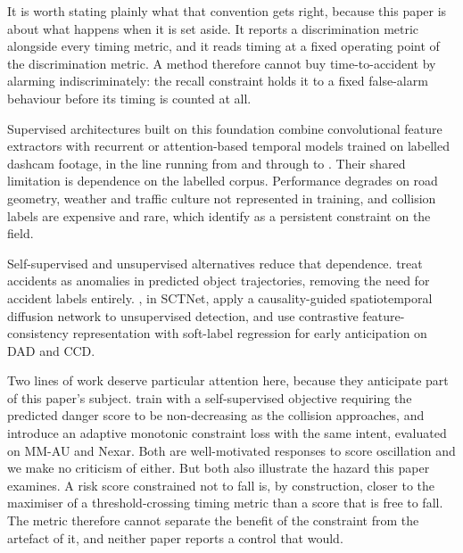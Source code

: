 It is worth stating plainly what that convention gets right, because this paper is about what happens when it is set aside. It reports a discrimination metric alongside every timing metric, and it reads timing at a fixed operating point of the discrimination metric. A method therefore cannot buy time-to-accident by alarming indiscriminately: the recall constraint holds it to a fixed false-alarm behaviour before its timing is counted at all.

Supervised architectures built on this foundation combine convolutional feature extractors with recurrent or attention-based temporal models trained on labelled dashcam footage, in the line running from \citet{chan2016dad} and \citet{bao2020ccd} through \citet{karim2022dsta} to \citet{kandacharam2025fusion}. Their shared limitation is dependence on the labelled corpus. Performance degrades on road geometry, weather and traffic culture not represented in training, and collision labels are expensive and rare, which \citet{zhang2025review} identify as a persistent constraint on the field.

Self-supervised and unsupervised alternatives reduce that dependence. \citet{yao2019unsupervised} treat accidents as anomalies in predicted object trajectories, removing the need for accident labels entirely. \citet{liu2026sctnet}, in SCTNet, apply a causality-guided spatiotemporal diffusion network to unsupervised detection, and \citet{zhong2025early} use contrastive feature-consistency representation with soft-label regression for early anticipation on DAD and CCD.

Two lines of work deserve particular attention here, because they anticipate part of this paper's subject. \citet{pjetri2025nondecreasing} train with a self-supervised objective requiring the predicted danger score to be non-decreasing as the collision approaches, and \citet{zou2026riskprop} introduce an adaptive monotonic constraint loss with the same intent, evaluated on MM-AU and Nexar. Both are well-motivated responses to score oscillation and we make no criticism of either. But both also illustrate the hazard this paper examines. A risk score constrained not to fall is, by construction, closer to the maximiser of a threshold-crossing timing metric than a score that is free to fall. The metric therefore cannot separate the benefit of the constraint from the artefact of it, and neither paper reports a control that would.

